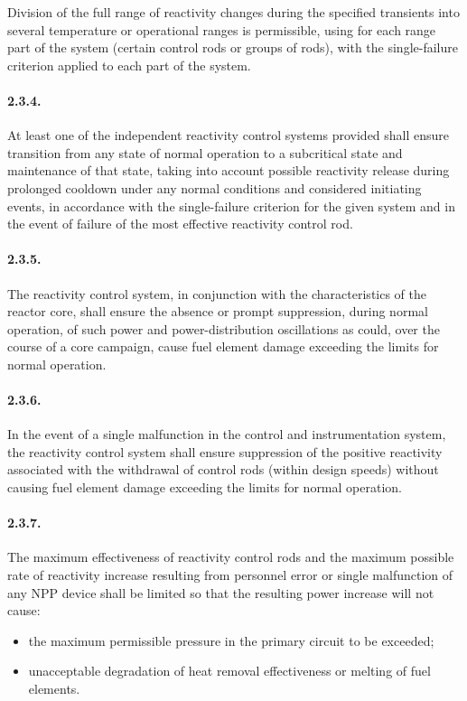 \documentclass[openright]{bookest}
\begin{document}
Division of the full range of reactivity changes during the specified transients into several temperature or operational ranges is permissible, using for each range part of the system (certain control rods or groups of rods), with the single-failure criterion applied to each part of the system.

\paragraph{2.3.4.}
At least one of the independent reactivity control systems provided shall ensure transition from any state of normal operation to a subcritical state and maintenance of that state, taking into account possible reactivity release during prolonged cooldown under any normal conditions and considered initiating events, in accordance with the single-failure criterion for the given system and in the event of failure of the most effective reactivity control rod.

\paragraph{2.3.5.}
The reactivity control system, in conjunction with the characteristics of the reactor core, shall ensure the absence or prompt suppression, during normal operation, of such power and power-distribution oscillations as could, over the course of a core campaign, cause fuel element damage exceeding the limits for normal operation.

\paragraph{2.3.6.}
In the event of a single malfunction in the control and instrumentation system, the reactivity control system shall ensure suppression of the positive reactivity associated with the withdrawal of control rods (within design speeds) without causing fuel element damage exceeding the limits for normal operation.

\paragraph{2.3.7.}
The maximum effectiveness of reactivity control rods and the maximum possible rate of reactivity increase resulting from personnel error or single malfunction of any NPP device shall be limited so that the resulting power increase will not cause:
\begin{itemize}
    \item the maximum permissible pressure in the primary circuit to be exceeded;
    \item unacceptable degradation of heat removal effectiveness or melting of fuel elements.
\end{itemize}
\end{document}

